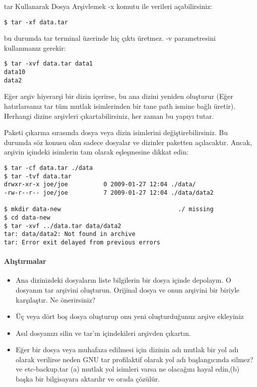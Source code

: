 \begin{section}{tar Kullanarak Dosya Arşivlemek}
-x komutu ile verileri açabilirsiniz:
\begin{verbatim}
$ tar -xf data.tar
\end{verbatim}
bu durumda tar terminal üzerinde hiç çıktı üretmez. -v parametresini kullanmanız gerekir:
\begin{verbatim}
$ tar -xvf data.tar data1
data10
data2
\end{verbatim}

Eğer arşiv hiyerarşi bir dizin içerirse, bu ana dizini yeniden oluşturur (Eğer hatırlarsanız tar tüm mutlak isimlerinden bir tane path ismine bağlı üretir). Herhangi dizine arşivleri çıkartabilirsiniz, her zaman bu yapıyı tutar.

Paketi çıkarma sırasında dosya veya dizin isimlerini değiştirebilirsiniz. Bu durumda söz konusu olan sadece dosyalar ve dizinler paketten açılacaktır. Ancak, arşivin içindeki isimlerin tam olarak eşleşmesine dikkat edin:
\begin{verbatim}
$ tar -cf data.tar ./data 
$ tar -tvf data.tar
drwxr-xr-x joe/joe          0 2009-01-27 12:04 ./data/
-rw-r--r-- joe/joe          7 2009-01-27 12:04 ./data/data2

$ mkdir data-new                                 ./ missing
$ cd data-new
$ tar -xvf ../data.tar data/data2
tar: data/data2: Not found in archive
tar: Error exit delayed from previous errors
\end{verbatim}
\paragraph{Alıştırmalar}{
\begin{itemize}
 \item Ana dizinizdeki dosyaların liste bilgilerin bir dosya içinde depolayın. O dosyanın tar arşivini oluşturun. Orijinal dosya ve onun arşivini bir biriyle karşılaştır. Ne önerirsiniz?
 \item Üç veya dört boş dosya oluşturup onu yeni oluşturduğunuz arşive ekleyiniz
 \item Asıl dosyanızı silin ve tar'ın içindekileri arşivden çıkartın.
 \item Eğer bir dosya veya muhafaza edilmesi için dizinin adı mutlak bir yol adı olarak verilirse neden GNU tar profilaktif olarak yol adı başlangıcında silmez? ve etc-backup.tar (a) mutlak yol isimleri varsa ne olacağını hayal edin,(b) başka bir bilgisayara aktarılır ve orada çözülür.
\end{itemize}}
\end{section}
